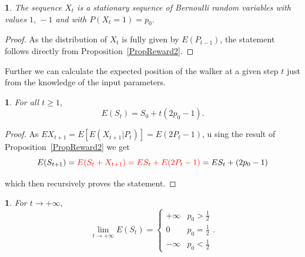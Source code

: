 \documentclass{amsart}
\theoremstyle{definition}
\theoremstyle{plain}
\newtheorem{prop}[thm]{\protect\propositionname}
\theoremstyle{plain}
\newtheorem{cor}[thm]{\protect\corollaryname}
\theoremstyle{plain}
\numberwithin{equation}{section}
\providecommand{\corollaryname}{Corollary}
\providecommand{\propositionname}{Proposition}
\begin{document}
    \begin{prop}
        The sequence $X_t$ is a stationary sequence of Bernoulli random
        variables with values $1,\,-1$ and with $P(X_t=1)=p_0$.
    \end{prop}
    \begin{proof}
        As the distribution of $X_t$ is fully given by $E(P_{t-1})$, the
        statement follows directly from Proposition~\ref{PropReward2}.
    \end{proof}

    {\color{red}Further we can} calculate the expected position of the walker at a given step $t$ just from the knowledge of the input parameters.

    \begin{prop}
        For all $t\geq1,$
        \[
            E(S_{t})=S_{0}+t(2p_{0}-1).
        \]
    \end{prop}
    \begin{proof}
    {\color{red}As $EX_{t+1}=E[E(X_{t+1}|P_t)]=E(2P_t -1)$, u}
        sing the result of Proposition~\ref{PropReward2} we get
        \[
            E(S_{t+1})= {\color{red}E(S_{t}+X_{t+1}) = ES_{t}+E(2P_{ \color{red}t}-1)}=
            ES_{t}+(2p_{0}-1)
        \]

        which then recursively proves the statement.
    \end{proof}

    \begin{cor}
        For $t\rightarrow+\infty,$ \textup{
            \[
                \lim_{t\to+\infty}E(S_{t})=\begin{cases}
                                               +\infty & p_{0}>\frac{1}{2}\\
                                               0 & p_{0}=\frac{1}{2}\\
                                               -\infty & p_{0}<\frac{1}{2}
                \end{cases}.
            \]
        }
    \end{cor}
\end{document}
